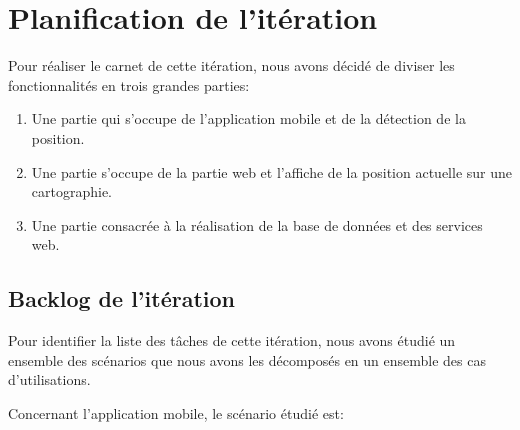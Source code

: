 

\section{Planification de l'itération}

Pour réaliser le carnet de cette itération, nous avons décidé de diviser les
fonctionnalités en trois grandes parties:

\begin{enumerate}
    \item Une partie qui s'occupe de l'application mobile et de la détection de la
        position.
    \item Une partie  s'occupe de la partie web et l'affiche de la position
        actuelle sur une cartographie.
    \item Une partie consacrée à la réalisation de la base de données et des
        services web.
\end{enumerate}

\subsection{Backlog de l'itération}

Pour identifier la liste des tâches de cette itération, nous avons étudié un ensemble
des scénarios que nous avons les décomposés en un ensemble des cas d'utilisations.

Concernant l'application mobile, le scénario étudié est:

